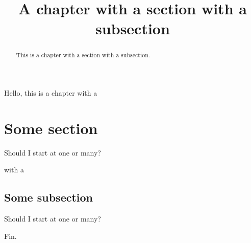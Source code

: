\documentclass{ximera}
\title{A chapter with a section with a subsection}
\begin{document}
\begin{abstract}
  This is a chapter with a section with a subsection.
\end{abstract}
\maketitle




Hello, this is a chapter with a

\section{Some section}
\begin{theorem}
  Should I start at one or many?
\end{theorem}
with a

\subsection{Some subsection}
\begin{theorem}
  Should I start at one or many?
\end{theorem}

Fin.
\end{document}
